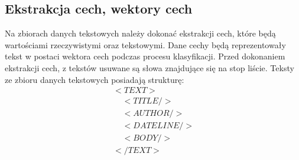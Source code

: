 \documentclass{classrep}
\begin{document}
\subsection{Ekstrakcja cech, wektory cech}
Na zbiorach danych tekstowych należy dokonać ekstrakcji cech, które będą wartościami rzeczywistymi oraz tekstowymi. Dane cechy będą reprezentowały tekst w postaci wektora cech podczas procesu klasyfikacji. Przed dokonaniem ekstrakcji cech, z tekstów usuwane są słowa znajdujące się na stop liście. Teksty ze zbioru danych tekstowych posiadają strukturę: \begin{equation}
  \begin{array}{l}
  <TEXT> \\
\;\;\;\; <TITLE/>\\
\;\;\;\; <AUTHOR/>\\
\;\;\;\; <DATELINE/>\\
 \;\;\;\;<BODY/> \\
</TEXT>
  \end{array}
\end{equation}\\
\end{document}
